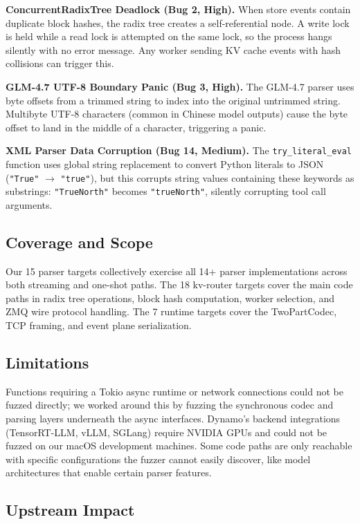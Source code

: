 \documentclass[11pt]{article}
\begin{document}
\textbf{ConcurrentRadixTree Deadlock (Bug 2, High).} When store events contain duplicate block hashes, the radix tree creates a self-referential node. A write lock is held while a read lock is attempted on the same lock, so the process hangs silently with no error message. Any worker sending KV cache events with hash collisions can trigger this.

\textbf{GLM-4.7 UTF-8 Boundary Panic (Bug 3, High).} The GLM-4.7 parser uses byte offsets from a trimmed string to index into the original untrimmed string. Multibyte UTF-8 characters (common in Chinese model outputs) cause the byte offset to land in the middle of a character, triggering a panic.

\textbf{XML Parser Data Corruption (Bug 14, Medium).} The \texttt{try\_literal\_eval} function uses global string replacement to convert Python literals to JSON (\texttt{"True"} $\rightarrow$ \texttt{"true"}), but this corrupts string values containing these keywords as substrings: \texttt{"TrueNorth"} becomes \texttt{"trueNorth"}, silently corrupting tool call arguments.

\subsection{Coverage and Scope}

Our 15 parser targets collectively exercise all 14+ parser implementations across both streaming and one-shot paths. The 18 kv-router targets cover the main code paths in radix tree operations, block hash computation, worker selection, and ZMQ wire protocol handling. The 7 runtime targets cover the TwoPartCodec, TCP framing, and event plane serialization.

\subsection{Limitations}

Functions requiring a Tokio async runtime or network connections could not be fuzzed directly; we worked around this by fuzzing the synchronous codec and parsing layers underneath the async interfaces. Dynamo's backend integrations (TensorRT-LLM, vLLM, SGLang) require NVIDIA GPUs and could not be fuzzed on our macOS development machines. Some code paths are only reachable with specific configurations the fuzzer cannot easily discover, like model architectures that enable certain parser features.

\subsection{Upstream Impact}
\end{document}
